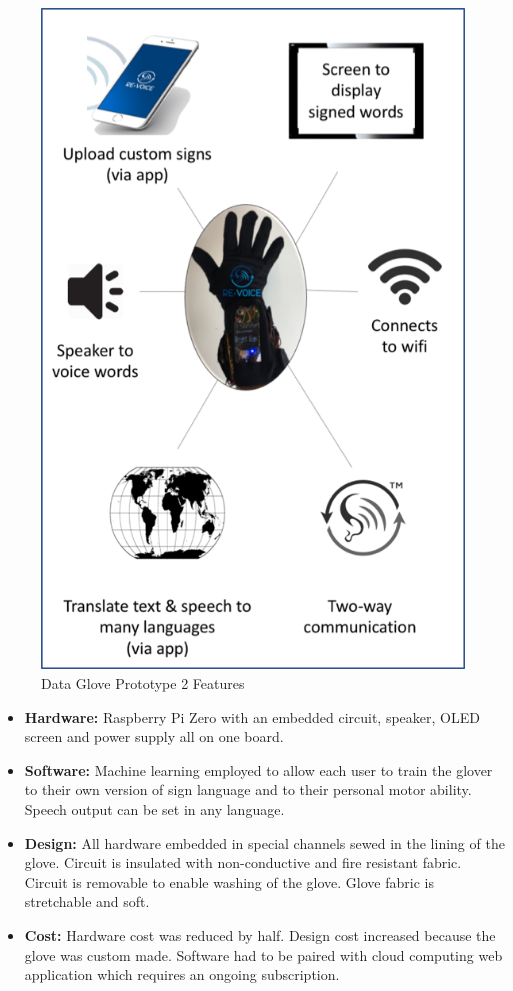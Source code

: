 \begin{figure}
    \centering
    \includegraphics{./assets/img/GloveFeatures}
    \caption{Data Glove Prototype 2 Features}
    \label{fig:glovefeatures}
\end{figure}


\begin{itemize}
    \item \textbf{Hardware:} Raspberry Pi Zero with an embedded circuit, speaker, OLED screen and power supply all on one board.
    \item \textbf{Software:} Machine learning employed to allow each user to train the glover to their own version of sign language and to their personal motor ability. Speech output can be set in any language. 
    \item \textbf{Design:} All hardware embedded in special channels sewed in the lining of the glove.  Circuit is insulated with non-conductive and fire resistant fabric.  Circuit is removable to enable washing of the glove. Glove fabric is stretchable and soft.  
    \item \textbf{Cost:} Hardware cost was reduced by half. Design cost increased because the glove was custom made. Software had to be paired with cloud computing web application which requires an ongoing subscription. 
\end{itemize}

